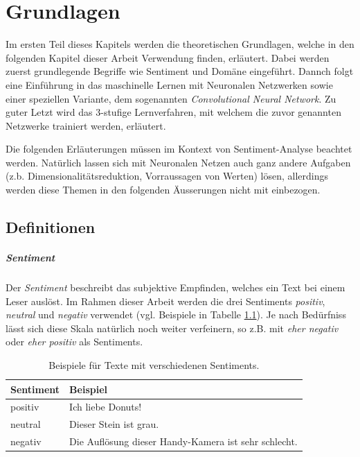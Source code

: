 \chapter{Grundlagen}
Im ersten Teil dieses Kapitels werden die theoretischen Grundlagen, welche in den folgenden Kapitel dieser Arbeit Verwendung finden, erläutert. Dabei werden zuerst grundlegende Begriffe wie Sentiment und Domäne eingeführt. Dannch folgt eine Einführung in das maschinelle Lernen mit Neuronalen Netzwerken sowie einer speziellen Variante, dem sogenannten \emph{Convolutional Neural Network}. Zu guter Letzt wird das 3-stufige Lernverfahren, mit welchem die zuvor genannten Netzwerke trainiert werden, erläutert.

Die folgenden Erläuterungen müssen im Kontext von Sentiment-Analyse beachtet werden. Natürlich lassen sich mit Neuronalen Netzen auch ganz andere Aufgaben (z.b. Dimensionalitätsreduktion, Vorraussagen von Werten) lösen, allerdings werden diese Themen in den folgenden Äusserungen nicht mit einbezogen.

\section{Definitionen}
\paragraph{Sentiment}
Der \emph{Sentiment} beschreibt das subjektive Empfinden, welches ein Text bei einem Leser auslöst. Im Rahmen dieser Arbeit werden die drei Sentiments \emph{positiv}, \emph{neutral} und \emph{negativ} verwendet (vgl. Beispiele in Tabelle \ref{basics:sentiments_example_table}). Je nach Bedürfniss lässt sich diese Skala natürlich noch weiter verfeinern, so z.B. mit \emph{eher negativ} oder \emph{eher positiv} als Sentiments.

\begin{table}[h]
  \centering
  \begin{tabular}{ll}
    \toprule
    Sentiment & Beispiel\\
    \midrule
    positiv & Ich liebe Donuts!\\
    neutral & Dieser Stein ist grau.\\
    negativ & Die Auflösung dieser Handy-Kamera ist sehr schlecht.\\
    \bottomrule
  \end{tabular}
  \caption{Beispiele für Texte mit verschiedenen Sentiments.}
  \label{basics:sentiments_example_table}
\end{table}

